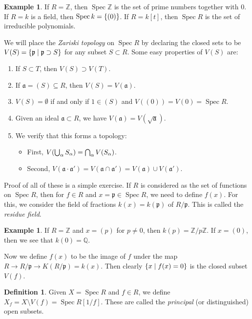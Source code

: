 \documentclass[leqno, openany]{memoir}
\theoremstyle{definition}
\newtheorem{defn}[thm]{Definition}
\newtheorem{exm}[thm]{Example}
\theoremstyle{remark}
\theoremstyle{plain}
\theoremstyle{definition}
\theoremstyle{remark}
\newcommand{\Z}{\mathbb{Z}}
\newcommand{\Q}{\mathbb{Q}}
\newcommand{\mf}[1]{\mathfrak{#1}}
\DeclareMathOperator{\Spec}{Spec}
\begin{document}
\begin{exm}
    If $R = \Z$, then $\Spec \Z$ is the set of prime numbers together with $0$. If $R = k$ is a field, then $\Spec k = \qty{(0)}$. If $R = k[t]$, then $\Spec R$ is the set of irreducible polynomials.
\end{exm}

We will place the \textit{Zariski topology} on $\Spec R$ by declaring the closed sets to be $V(S) = \qty{\mf{p} \mid \mf{p} \supset S}$ for any subset $S \subset R$. Some easy properties of $V(S)$ are:
\begin{enumerate}
    \item If $S \subset T$, then $V(S) \supset V(T)$.
    \item If $\mf{a} = (S) \subseteq R$, then $V(S) = V(\mf{a})$.
    \item $V(S) = \emptyset$ if and only if $1 \in (S)$ and $V((0)) = V(\qty{0}) = \Spec R$.
    \item Given an ideal $\mf{a} \subset R$, we have $V(\mf{a}) = V(\sqrt{\mf{a}})$.
    \item We verify that this forms a topology:
        \begin{itemize}
            \item First, $V\qty(\bigcup_{\alpha} S_{\alpha}) = \bigcap_{\alpha} V(S_{\alpha})$.
            \item Second, $V(\mf{a} \cdot \mf{a}') = V(\mf{a} \cap \mf{a}') = V(\mf{a}) \cup V(\mf{a}')$.
        \end{itemize}
\end{enumerate}

Proof of all of these is a simple exercise. If $R$ is considered as the set of functions on $\Spec R$, then for $f \in R$ and $x = \mf{p} \in \Spec R$, we need to define $f(x)$. For this, we consider the field of fractions $k(x) = k(\mf{p})$ of $R/\mf{p}$. This is called the \textit{residue field}. 

\begin{exm}
    If $R = \Z$ and $x = (p)$ for $p \neq 0$, then $k(p) = \Z/p\Z$. If $x = (0)$, then we see that $k(0) = \Q$.
\end{exm}

Now we define $f(x)$ to be the image of $f$ under the map $R \to R/\mf{p} \to K(R/\mf{p}) = k(x)$. Then clearly $\qty{x \mid f(x) = 0}$ is the closed subset $V(f)$.

\begin{defn}
    Given $X = \Spec R$ and $f \in R$, we define $X_f = X \setminus V(f) = \Spec R[1/f]$. These are called the \textit{principal} (or distinguished) open subsets. 
\end{defn}
\end{document}
